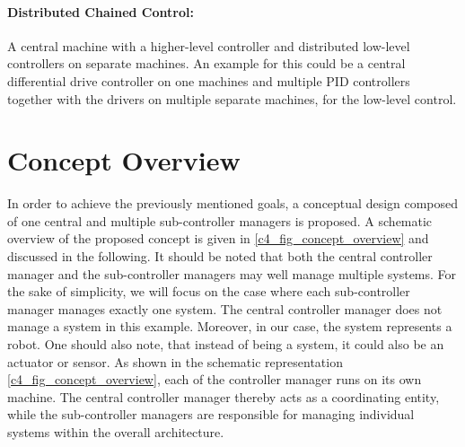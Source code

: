\paragraph{Distributed Chained Control:}\label{c4_sec_distributed_controller_chaining}
A central machine with a higher-level controller and distributed low-level controllers on separate machines. An example for this could be a central differential drive controller on one machines and multiple PID controllers together with the drivers on multiple separate machines, for the low-level control. 


\section{Concept Overview}\label{c4_sec_overview}
In order to achieve the previously mentioned goals, a conceptual design composed of one central and multiple sub-controller managers is proposed. A schematic overview of the proposed concept is given in \autoref{c4_fig_concept_overview} and discussed in the following. It should be noted that both the central controller manager and the sub-controller managers may well manage multiple systems. For the sake of simplicity, we will focus on the case where each sub-controller manager manages exactly one system. The central controller manager does not manage a system in this example. Moreover, in our case, the system represents a robot. One should also note, that instead of being a system, it could also be an actuator or sensor.\newline
As shown in the schematic representation \autoref{c4_fig_concept_overview}, each of the controller manager runs on its own machine. The central controller manager thereby acts as a coordinating entity, while the sub-controller managers are responsible for managing individual systems within the overall architecture.\newline
